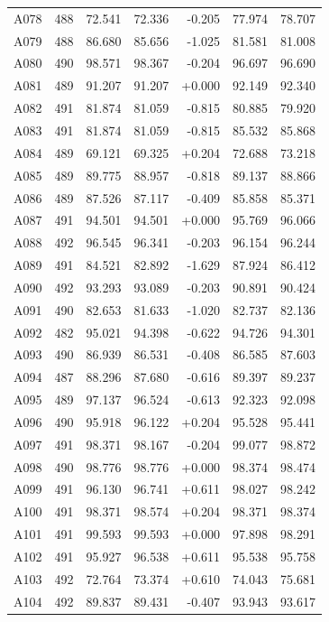 \begin{longtable}{lrrrrrr}
A078 & 488 & 72.541 & 72.336 & -0.205 & 77.974 & 78.707 \\
A079 & 488 & 86.680 & 85.656 & -1.025 & 81.581 & 81.008 \\
A080 & 490 & 98.571 & 98.367 & -0.204 & 96.697 & 96.690 \\
A081 & 489 & 91.207 & 91.207 & +0.000 & 92.149 & 92.340 \\
A082 & 491 & 81.874 & 81.059 & -0.815 & 80.885 & 79.920 \\
A083 & 491 & 81.874 & 81.059 & -0.815 & 85.532 & 85.868 \\
A084 & 489 & 69.121 & 69.325 & +0.204 & 72.688 & 73.218 \\
A085 & 489 & 89.775 & 88.957 & -0.818 & 89.137 & 88.866 \\
A086 & 489 & 87.526 & 87.117 & -0.409 & 85.858 & 85.371 \\
A087 & 491 & 94.501 & 94.501 & +0.000 & 95.769 & 96.066 \\
A088 & 492 & 96.545 & 96.341 & -0.203 & 96.154 & 96.244 \\
A089 & 491 & 84.521 & 82.892 & -1.629 & 87.924 & 86.412 \\
A090 & 492 & 93.293 & 93.089 & -0.203 & 90.891 & 90.424 \\
A091 & 490 & 82.653 & 81.633 & -1.020 & 82.737 & 82.136 \\
A092 & 482 & 95.021 & 94.398 & -0.622 & 94.726 & 94.301 \\
A093 & 490 & 86.939 & 86.531 & -0.408 & 86.585 & 87.603 \\
A094 & 487 & 88.296 & 87.680 & -0.616 & 89.397 & 89.237 \\
A095 & 489 & 97.137 & 96.524 & -0.613 & 92.323 & 92.098 \\
A096 & 490 & 95.918 & 96.122 & +0.204 & 95.528 & 95.441 \\
A097 & 491 & 98.371 & 98.167 & -0.204 & 99.077 & 98.872 \\
A098 & 490 & 98.776 & 98.776 & +0.000 & 98.374 & 98.474 \\
A099 & 491 & 96.130 & 96.741 & +0.611 & 98.027 & 98.242 \\
A100 & 491 & 98.371 & 98.574 & +0.204 & 98.371 & 98.374 \\
A101 & 491 & 99.593 & 99.593 & +0.000 & 97.898 & 98.291 \\
A102 & 491 & 95.927 & 96.538 & +0.611 & 95.538 & 95.758 \\
A103 & 492 & 72.764 & 73.374 & +0.610 & 74.043 & 75.681 \\
A104 & 492 & 89.837 & 89.431 & -0.407 & 93.943 & 93.617 \\

\end{longtable}
